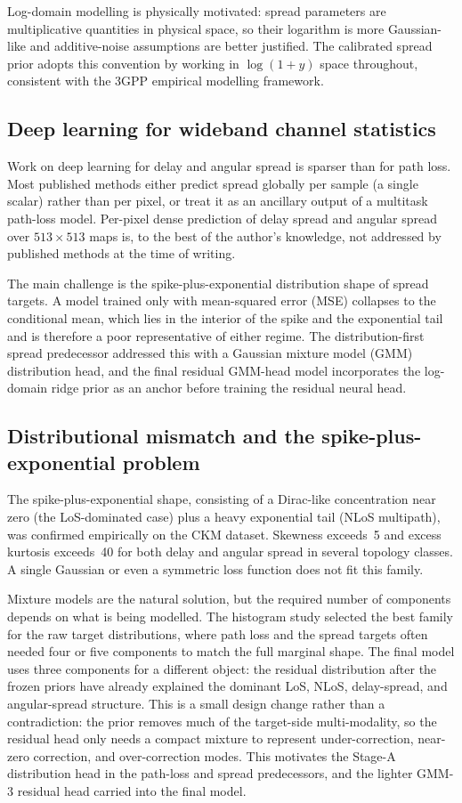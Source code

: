 Log-domain modelling is physically motivated: spread parameters are
multiplicative quantities in physical space, so their logarithm is more
Gaussian-like and additive-noise assumptions are better justified. The calibrated spread prior adopts
this convention by working in $\log(1+y)$ space throughout, consistent with the
3GPP empirical modelling framework.

\subsection{Deep learning for wideband channel statistics}

Work on deep learning for delay and angular spread is sparser than for path
loss. Most published methods either predict spread globally per sample (a single scalar)
rather than per pixel, or treat it as an ancillary output of a multitask
path-loss model.  Per-pixel dense prediction of delay spread and angular spread
over $513 \times 513$ maps is, to the best of the author's knowledge, not
addressed by published methods at the time of writing.

The main challenge is the spike-plus-exponential distribution shape of spread
targets.  A model trained only with mean-squared error (MSE) collapses to the
conditional mean, which lies in the interior of the spike and the exponential
tail and is therefore a poor representative of either regime. The
distribution-first spread predecessor addressed this with a Gaussian mixture
model (GMM) distribution head, and the final residual GMM-head model incorporates the
log-domain ridge prior as an anchor before training the residual neural head.

\subsection{Distributional mismatch and the spike-plus-exponential problem}

The spike-plus-exponential shape, consisting of a Dirac-like concentration near zero
(the LoS-dominated case) plus a heavy exponential tail (NLoS multipath), was
confirmed empirically on the CKM dataset.  Skewness exceeds~5 and excess kurtosis
exceeds~40 for both delay and angular spread in several topology classes.  A
single Gaussian or even a symmetric loss function does not fit this family.

Mixture models are the natural solution, but the required number of components
depends on what is being modelled. The histogram study selected the
best family for the raw target distributions, where path loss and the spread
targets often needed four or five components to match the full marginal shape.
The final model uses three components for a different object: the residual distribution
after the frozen priors have already explained the dominant LoS,
NLoS, delay-spread, and angular-spread structure.  This is a small design
change rather than a contradiction: the prior removes much of the target-side
multi-modality, so the residual head only needs a compact mixture to represent
under-correction, near-zero correction, and over-correction modes.  This
motivates the Stage-A distribution head in the path-loss and spread
predecessors, and the lighter GMM-3 residual head carried into the final model.

